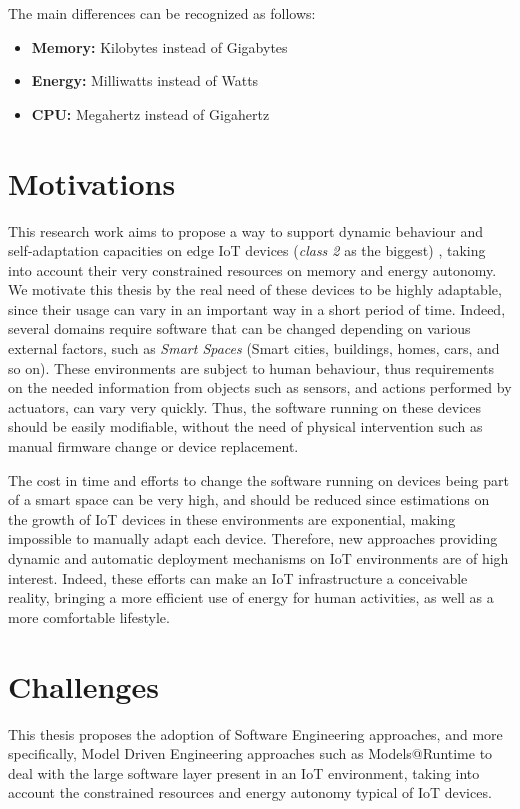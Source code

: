 The main differences can be recognized as follows:
\begin{itemize}
	\item \textbf{Memory:} Kilobytes instead of Gigabytes
	\item \textbf{Energy:} Milliwatts instead of Watts
	\item \textbf{CPU:} Megahertz instead of Gigahertz 
\end{itemize}

\section{Motivations}
This research work aims to propose a way to support dynamic behaviour and self-adaptation capacities on edge IoT devices (\textit{class 2} \cite{rfc7228} as the biggest) , taking into account their very constrained resources on memory and energy autonomy.
We motivate this thesis by the real need of these devices to be highly adaptable, since their usage can vary in an important way in a short period of time.
Indeed, several domains require software that can be changed depending on various external factors, such as \textit{Smart Spaces} (Smart cities, buildings, homes, cars, and so on).
These environments are subject to human behaviour, thus requirements on the needed information from objects such as sensors, and actions performed by actuators, can vary very quickly.
Thus, the software running on these devices should be easily modifiable, without the need of physical intervention such as manual firmware change or device replacement.

The cost in time and efforts to change the software running on devices being part of a smart space can be very high, and should be reduced since estimations on the growth of IoT devices in these environments are exponential, making impossible to manually adapt each device.
Therefore, new approaches providing dynamic and automatic deployment mechanisms on IoT environments are of high interest.
Indeed, these efforts can make an IoT infrastructure a conceivable reality, bringing a more efficient use of energy for human activities, as well as a more comfortable lifestyle.

\section{Challenges}
This thesis proposes the adoption of Software Engineering approaches, and more specifically, Model Driven Engineering approaches such as Models@Runtime \cite{morin2010leveraging} to deal with the large software layer present in an IoT environment, taking into account the constrained resources and energy autonomy typical of IoT devices.


